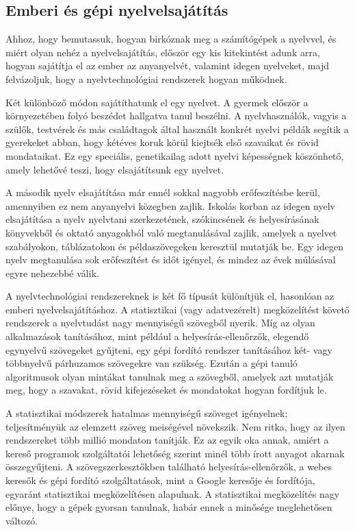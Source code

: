 \begin{multicols}{2}
\subsection{Emberi és gépi nyelvelsajátítás}

Ahhoz, hogy bemutassuk, hogyan birkóznak meg a számítógépek a nyelvvel, és miért olyan nehéz a nyelvelsajátítás, elő\-ször egy kis kitekintést adunk arra, hogyan sajátítja el az ember az anyanyelvét, valamint idegen nyelveket, majd felvázoljuk, hogy a nyelvtechnológiai rend\-sze\-rek hogyan működnek. 


Két különböző módon sajátíthatunk el egy nyelvet. A gyermek először a kör\-nye\-ze\-té\-ben folyó beszédet hallgatva tanul beszélni. A nyelvhasználók, vagyis a szülők, testvérek és más családtagok által használt konkrét nyelvi példák segítik a gyerekeket abban, hogy kétéves koruk körül kiejtsék első szavaikat és rövid mondataikat. Ez egy speciális, genetikailag adott nyelvi képességnek köszönhető, a\-mely lehetővé teszi, hogy elsajátítsunk egy nyelvet. 

A második nyelv elsajátítása már ennél sokkal nagyobb erőfeszítésbe kerül, a\-mennyi\-ben ez nem anyanyelvi közegben zajlik. Iskolás korban az idegen nyelv elsajátítása a nyelv nyelvtani szerkezetének, szókincsének és helyesírásának könyvekből és oktató anyagokból való megtanulásával zajlik, amelyek a nyelvet szabályokon, táblázatokon és példaszövegeken keresztül mutatják be. Egy idegen nyelv meg\-ta\-nu\-lá\-sa sok erőfeszítést és időt igényel, és mindez  az évek múlásával egyre nehezebbé válik.  

A nyelvtechnológiai rendszereknek is két fő típusát különítjük el, hasonlóan az emberi nyelvelsajátításhoz. A statisztikai (vagy adatvezérelt) megközelítést követő rendszerek a nyelvtudást nagy mennyi\-sé\-gű  szövegből nyerik. Míg az olyan alkalmazások tanításához, mint például a helyesírás-ellenőrzők, elegendő egynyelvű szövegeket gyűjteni, egy gépi fordító rendszer tanításához két- vagy többnyelvű párhuzamos szövegekre van szükség. Ez\-után a gépi tanuló algoritmusok olyan mintákat tanulnak meg a szövegből, amelyek azt mutatják meg, hogy a szavakat, rövid kifejezéseket és mondatokat hogyan fordítjuk le.  

A statisztikai módszerek hatalmas mennyi\-sé\-gű szöveget igényelnek; teljesítményük az elemzett szöveg meiségével növekszik. Nem ritka, hogy az ilyen rendszereket több millió mondaton tanítják. Ez az egyik oka annak, amiért a kereső programok szolgáltatói lehetőség szerint minél több írott anyagot akarnak össze\-gyűj\-te\-ni. A szövegszerkesztőkben található helyesírás-ellenőrzők, a webes keresők és gépi fordító szolgáltatások, mint a Google keresője és fordítója, egyaránt statisztikai megközelítésen alapulnak. A statisztikai megközelítés nagy előnye, hogy a gépek gyorsan tanulnak, habár ennek a minősége meglehetősen változó.


\end{multicols}
